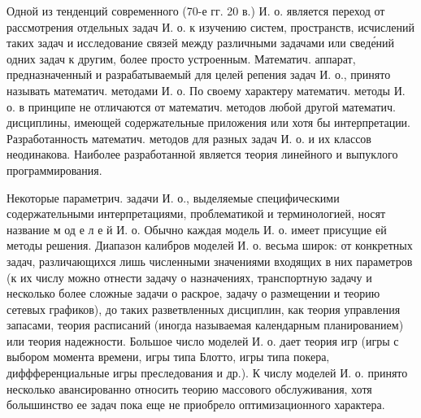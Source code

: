 \documentclass[10pt]{article}
\begin{document}
Одной из тенденций современного (70-е гг. 20 в.) И. о. является переход от рассмотрения отдельных задач И. о. к изучению систем, пространств, исчислений таких задач и исследование связей между различными задачами или сведе́ний одних задач к другим, более просто устроенным. Математич. аппарат, предназначенный и разрабатываемый для целей репения задач И. о., принято называть математич. методами И. о. По своему характеру математич. методы И. о. в принципе не отличаются от математич. методов любой другой математич. дисциплины, имеющей содержательные приложения или хотя бы интерпретации. Разработанность математич. методов для разных задач И. о. и их классов неодинакова. Наиболее разработанной является теория линейного и выпуклого программирования.



Некоторые параметрич. задачи И. о., выделяемые специфическими содержательными интерпретациями, проблематикой и терминологией, носят название м од е л е й И. о. Обычно каждая модель И. о. имеет присущие ей методы решения. Диапазон калибров моделей И. о. весьма широк: от конкретных задач, различающихся лишь численными значениями входящих в них параметров (к их числу можно отнести задачу о назначениях, транспортную задачу и несколько более сложные задачи о раскрое, задачу о размещении и теорию сетевых графиков), до таких разветвленных дисциплин, как теория управления запасами, теория расписаний (иногда называемая календарным планированием) или теория надежности. Большое число моделей И. о. дает теория игр (игры с выбором момента времени, игры типа Блотто, игры типа покера, диффференциальные игры преследования и др.). К числу моделей И. о. принято несколько авансированно относить теорию массового обслуживания, хотя болышинство ее задач пока еще не приобрело оптимизационного характера.
\end{document}
